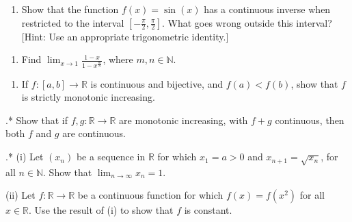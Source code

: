 \documentclass[letterpaper,10pt,english]{jupyterBook}
\begin{document}
\label{\detokenize{Problems:id32}}\begin{enumerate}
%
\setcounter{enumi}{31}
\item {} 
\sphinxAtStartPar
Show that the function \(f(x) = \sin(x)\) has a continuous inverse when restricted to the interval \(\left[-\frac{\pi}{2}, \frac{\pi}{2}\right]\). What goes wrong outside this interval? {[}Hint: Use an appropriate trigonometric identity.{]}

\end{enumerate}
\label{\detokenize{Problems:id33}}\begin{enumerate}
%
\setcounter{enumi}{32}
\item {} 
\sphinxAtStartPar
Find \(\displaystyle\lim_{x \rightarrow 1}\frac{1 - x}{1 - x^{\frac{m}{n}}}\), where \(m, n \in \mathbb{N}\).

\end{enumerate}
\label{\detokenize{Problems:id34}}\begin{enumerate}
%
\setcounter{enumi}{33}
\item {} 
\sphinxAtStartPar
If \(f:[a, b] \rightarrow \mathbb{R}\) is continuous and bijective, and \(f(a) < f(b)\), show that \(f\) is strictly monotonic increasing.

\end{enumerate}
\label{\detokenize{Problems:id35}}
.* Show that if \(f, g: \mathbb{R} \rightarrow \mathbb{R}\)  are monotonic increasing, with \(f+g\) continuous, then both \(f\) and \(g\) are continuous.

\label{\detokenize{Problems:id36}}
.*
(i) Let \((x_{n})\) be a sequence in \(\mathbb{R}\) for which \(x_{1} = a > 0\) and \(x_{n+1} = \sqrt{x_{n}}\), for all \(n\in\mathbb{N}\). Show that \(\displaystyle\lim_{n \rightarrow \infty} x_{n} = 1\).

\sphinxAtStartPar
(ii) Let \(f: \mathbb{R} \rightarrow \mathbb{R}\) be a continuous function for which \(f(x) = f(x^{2})\) for all \(x \in \mathbb{R}\). Use the result of (i) to show that \(f\) is constant.
\end{document}
